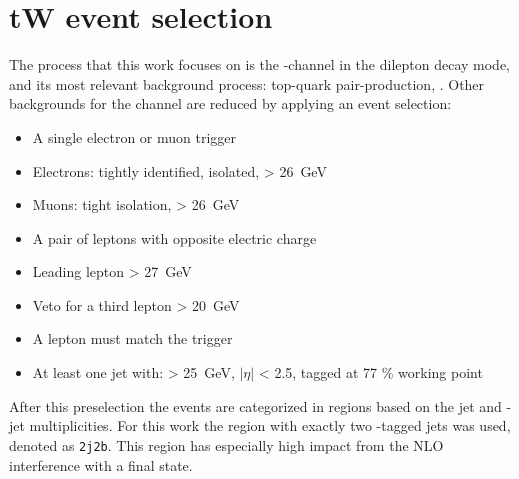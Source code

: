 




\section{tW event selection}

The process that this work focuses on is the \tW-channel in the dilepton decay mode, and its most relevant background process: top-quark pair-production, \ttbar.
Other backgrounds for the \tW channel are reduced by applying an event selection:


\begin{itemize}
\item A single electron or muon trigger
\item Electrons: tightly identified, isolated, \ET > \SI{26}{\giga \electronvolt}
\item Muons: tight isolation, \pT > \SI{26}{\giga \electronvolt}
\item A pair of leptons with opposite electric charge
\item Leading lepton \pT > \SI{27}{\giga \electronvolt}
\item Veto for a third lepton \pT > \SI{20}{\giga \electronvolt}
\item A lepton must match the trigger
\item At least one jet with: \pT > \SI{25}{\giga \electronvolt}, $|\eta|$ < \num{2.5}, tagged at \num{77} \% working point
\end{itemize}

After this preselection the events are categorized in regions based on the jet and \Pbottom-jet multiplicities. For this work the region with exactly two \Pbottom-tagged jets was used, denoted as \texttt{2j2b}. This region has especially high impact from the NLO interference with a \ttbar final state.

